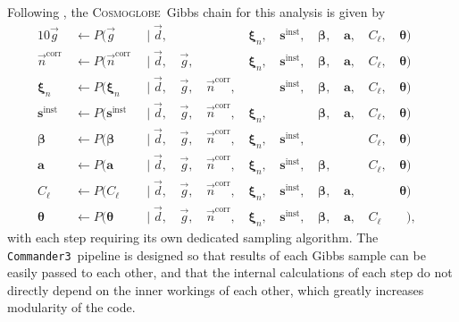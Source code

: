 \documentclass[twocolumn]{../../common/aa}
\def\commanderthree{\texttt{Commander3}}
\newcommand{\g}[0]{\vec{g}}
\newcommand{\cosmoglobe}{\textsc{Cosmoglobe}}
\newcommand{\ncorr}{\vec n^\mathrm{corr}}
\newcommand{\data}{\vec d}
\begin{document}
Following \citet{bp01}, the \cosmoglobe\ Gibbs chain for this analysis is given by
\begin{alignat}{10}
\label{eq:gain_samp_dist}\g &\,\leftarrow          P(\g&\,               \mid \data, &\,    &          &\,\boldsymbol\xi_n,  &\,\boldsymbol s^\mathrm{inst}, &\,\boldsymbol\beta, &\,\boldsymbol a, &\,C_{\ell},&\,\boldsymbol\theta)\\
\label{eq:ncorr_samp_dist} \ncorr &\,\leftarrow    P(\ncorr&\,           \mid \data, &\,\g, &\,        &\,\boldsymbol\xi_n,  &\,\boldsymbol s^\mathrm{inst}, &\,\boldsymbol\beta, &\,\boldsymbol a, &\,C_{\ell},&\,\boldsymbol\theta)\\ 
\label{eq:xi_samp_dist} \boldsymbol\xi_n &\,\leftarrow        P(\boldsymbol\xi_n&\,            \mid \data, &\,\g, &\,\ncorr, &\,        &\,\boldsymbol s^\mathrm{inst}, &\,\boldsymbol\beta, &\,\boldsymbol a, &\,C_{\ell},&\,\boldsymbol\theta)\\
\label{eq:samp_inst}\boldsymbol s^\mathrm{inst} &\,\leftarrow                                 P(\boldsymbol s^\mathrm{inst}&\,             \mid \data, &\,\g, &\,\ncorr, &\,\boldsymbol\xi_n,  &\,      &\,\boldsymbol\beta, &\,\boldsymbol a, &\,C_{\ell},&\,\boldsymbol\theta)\\
\label{eq:beta_samp}\boldsymbol\beta &\,\leftarrow                     P(\boldsymbol\beta&\, \mid \data, &\,\g, &\,\ncorr, &\,\boldsymbol\xi_n,  &\,\boldsymbol s^\mathrm{inst}, &\,       &\,    &\,C_{\ell},&\,\boldsymbol\theta)\\
\boldsymbol a &\,\leftarrow                                   P(\boldsymbol a&\,               \mid \data, &\,\g, &\,\ncorr, &\,\boldsymbol\xi_n,  &\,\boldsymbol s^\mathrm{inst}, &\,\boldsymbol\beta, &\,    &\,C_{\ell},&\,\boldsymbol\theta)\\
C_{\ell} &\,\leftarrow                             P(C_{\ell}&\,         \mid \data, &\,\g, &\,\ncorr, &\,\boldsymbol\xi_n,  &\,\boldsymbol s^\mathrm{inst}, &\,\boldsymbol\beta, &\,\boldsymbol a,&\,\phantom{C_{\ell}}&\,\boldsymbol\theta)&\label{eq:cl_sampling}\\
\boldsymbol\theta &\,\leftarrow                             P(\boldsymbol\theta&\,         \mid \data, &\,\g, &\,\ncorr, &\,\boldsymbol\xi_n,  &\,\boldsymbol s^\mathrm{inst}, &\,\boldsymbol\beta, &\,\boldsymbol a,&\,C_\ell\phantom{,}&\,\phantom{\boldsymbol\theta})\label{eq:param_samp},
\end{alignat}
with each step requiring its own dedicated sampling algorithm. The \commanderthree\ pipeline is designed so that results of each Gibbs sample can be easily passed to each other, and that the internal calculations of each step do not directly depend on the inner workings of each other, which greatly increases modularity of the code. 
\end{document}
